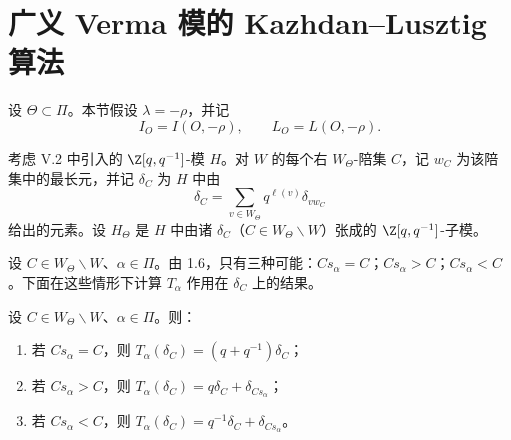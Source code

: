\section{广义 Verma 模的 Kazhdan--Lusztig 算法}\label{sec:06.6.3}

设 $\Theta\subset\Pi$。本节假设 $\lambda=-\rho$，并记
$$I_O=I(O,-\rho),\qquad L_O=L(O,-\rho).$$

考虑 V.2 中引入的 $\Z[q,q^{-1}]$-模 $H$。对 $W$ 的每个右 $W_\Theta$-陪集 $C$，记 $w_C$ 为该陪集中的最长元，并记 $\delta_C$ 为 $H$ 中由
$$\delta_C=\sum_{v\in W_\Theta}q^{\ell(v)}\delta_{vw_C}$$
给出的元素。设 $H_\Theta$ 是 $H$ 中由诸 $\delta_C$（$C\in W_\Theta\backslash W$）张成的 $\Z[q,q^{-1}]$-子模。

设 $C\in W_\Theta\backslash W$、$\alpha\in\Pi$。由 1.6，只有三种可能：$Cs_\alpha=C$；$Cs_\alpha>C$；$Cs_\alpha<C$。下面在这些情形下计算 $T_\alpha$ 作用在 $\delta_C$ 上的结果。

\begin{lemma}\label{lem:06.3.1}
设 $C\in W_\Theta\backslash W$、$\alpha\in\Pi$。则：
\begin{enumerate}[label=(\roman*)]
\item 若 $Cs_\alpha=C$，则 $T_\alpha(\delta_C)=(q+q^{-1})\delta_C$；
\item 若 $Cs_\alpha>C$，则 $T_\alpha(\delta_C)=q\delta_C+\delta_{Cs_\alpha}$；
\item 若 $Cs_\alpha<C$，则 $T_\alpha(\delta_C)=q^{-1}\delta_C+\delta_{Cs_\alpha}$。
\end{enumerate}
\end{lemma}

